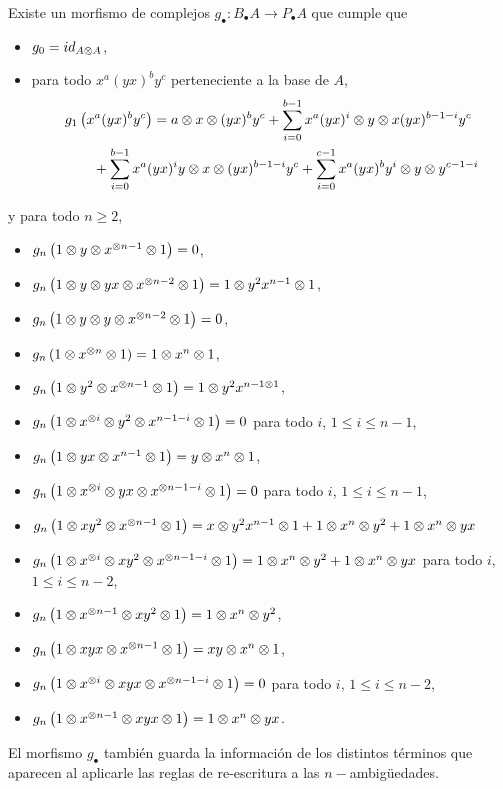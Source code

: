 \documentclass[fleqn,../tesis.tex]{subfiles}
\begin{document}
\begin{prop}
	Existe un morfismo de complejos $g_{\bullet} : B_{\bullet}A \to P_{\bullet}A$ que cumple que
	\begin{itemize}
		\item $g_0 = id_{A\otimes A}$,
		\item para todo $x^{a}(yx)^{b}y^c$ perteneciente a la base de $A$,
		\begin{align*}
			&g_1\left(x^{a}(yx)^{b}y^c\right) = a\otimes x \otimes (yx)^by^c
				+ \sum_{i = 0}^{b - 1} x^{a}(yx)^{i}\otimes y \otimes x(yx)^{b - 1 - i}y^c\\
			&\qquad + \sum_{i = 0}^{b - 1}x^{a}(yx)^{i}y \otimes x \otimes (yx)^{b - 1 - i}y^c
				+ \sum_{i =0}^{c - 1}x^{a}(yx)^{b} y^{i}\otimes y \otimes y^{c - 1 - i}
		\end{align*}
	\end{itemize}
	y para todo $n \geq 2$,
	\begin{itemize}
		\item $g_n\left(1\otimes y \otimes x^{\otimes n - 1}\otimes 1\right) = 0$,
		\item $g_n\left(1\otimes y \otimes yx \otimes x^{ \otimes n - 2} \otimes 1\right) = 1\otimes y^2 x^{n - 1} \otimes 1$,
		\item $g_n\left(1\otimes y \otimes y \otimes x^{\otimes n - 2} \otimes 1\right) = 0$,
		\item $g_n\left(1\otimes x^{\otimes n} \otimes 1\right) = 1\otimes x^n \otimes 1$,
		\item $g_n\left(1\otimes y^2 \otimes x^{\otimes n - 1}\otimes 1\right) = 1 \otimes y^{2}x^{n - 1 \otimes 1}$,
		\item $g_n\left(1\otimes x^{\otimes i} \otimes y^{2} \otimes x^{n - 1 - i} \otimes 1\right) =  0$
			para todo $i$, $1 \leq i \leq n  - 1$,
		\item $g_n\left(1\otimes yx \otimes x^{n - 1} \otimes 1\right) = y\otimes x^{n}\otimes 1$,
		\item $g_n\left(1\otimes x^{\otimes i} \otimes yx \otimes x^{\otimes n - 1 - i}\otimes 1\right) = 0$
			para todo $i$, $1 \leq i \leq n  - 1$,
		\item $g_n\left(1 \otimes xy^{2} \otimes x^{\otimes n - 1}\otimes 1\right) = x \otimes y^2x^{n - 1} \otimes 1
			+ 1 \otimes x^{n} \otimes y^{2} + 1 \otimes x^{n} \otimes yx$
		\item $g_n\left(1 \otimes x^{\otimes i}\otimes xy^{2} \otimes x^{\otimes n - 1 - i}\otimes 1\right) =
			1 \otimes x^{n} \otimes y^{2} + 1 \otimes x^{n} \otimes yx$ para todo $i$,\\ $1 \leq i \leq n  - 2$,
		\item $g_n\left(1 \otimes x^{\otimes n - 1}\otimes xy^{2} \otimes 1\right) = 1 \otimes x^{n} \otimes y^{2}$,
		\item $g_n\left(1 \otimes xyx \otimes x^{\otimes n - 1}\otimes 1\right) = xy \otimes x^{n} \otimes 1$,
		\item $g_n\left(1 \otimes x^{\otimes i}\otimes xyx \otimes x^{\otimes n - 1 - i}\otimes 1\right) = 0$
			para todo $i$, $1 \leq i \leq n  - 2$,
		\item $g_n\left(1 \otimes x^{\otimes n - 1}\otimes xyx \otimes 1\right) = 1 \otimes x^{n} \otimes yx$.
	\end{itemize}
\end{prop}
El morfismo $g_{\bullet}$ también guarda la información de los distintos términos que aparecen al aplicarle las reglas
de re-escritura a las $n-$ambigüedades.
\end{document}
